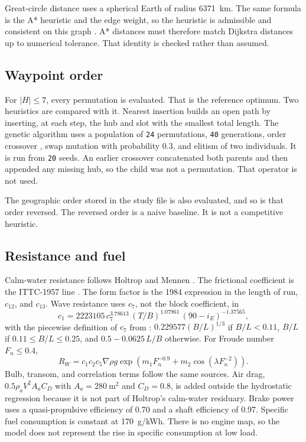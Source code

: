 \documentclass[11pt]{article}
\begin{document}
Great-circle distance uses a spherical Earth of radius 6371~km.
The same formula is the A* heuristic and the edge weight, so the heuristic is admissible and consistent on this graph \citep{hart1968}.
A* distances must therefore match Dijkstra distances \citep{dijkstra1959} up to numerical tolerance.
That identity is checked rather than assumed.

\subsection{Waypoint order}
For \(|H|\le 7\), every permutation is evaluated.
That is the reference optimum.
Two heuristics are compared with it.
Nearest insertion builds an open path by inserting, at each step, the hub and slot with the smallest total length.
The genetic algorithm uses a population of \texttt{24} permutations, \texttt{40} generations, order crossover \citep{davis1985}, swap mutation with probability 0.3, and elitism of two individuals.
It is run from \texttt{20} seeds.
An earlier crossover concatenated both parents and then appended any missing hub, so the child was not a permutation.
That operator is not used.

The geographic order stored in the study file is also evaluated, and so is that order reversed.
The reversed order is a naive baseline.
It is not a competitive heuristic.

\subsection{Resistance and fuel}
Calm-water resistance follows Holtrop and Mennen \citep{holtrop1982,holtrop1984}.
The frictional coefficient is the ITTC-1957 line \citep{ittc1957}.
The form factor is the 1984 expression in the length of run, \(c_{12}\), and \(c_{13}\).
Wave resistance uses \(c_7\), not the block coefficient, in
\begin{equation}
c_1 = 2223105\, c_7^{3.78613}\,(T/B)^{1.07961}\,(90-i_E)^{-1.37565},
\end{equation}
with the piecewise definition of \(c_7\) from \citet{holtrop1984}: \(0.229577(B/L)^{1/3}\) if \(B/L<0.11\), \(B/L\) if \(0.11\le B/L\le 0.25\), and \(0.5-0.0625\,L/B\) otherwise.
For Froude number \(F_n\le 0.4\),
\begin{equation}
R_W = c_1 c_2 c_5 \nabla \rho g \exp\!\left(m_1 F_n^{-0.9} + m_2 \cos(\lambda F_n^{-2})\right).
\end{equation}
Bulb, transom, and correlation terms follow the same sources.
Air drag, \(0.5\rho_a V^2 A_a C_D\) with \(A_a=280~\mathrm{m}^2\) and \(C_D=0.8\), is added outside the hydrostatic regression because it is not part of Holtrop's calm-water residuary.
Brake power uses a quasi-propulsive efficiency of 0.70 and a shaft efficiency of 0.97.
Specific fuel consumption is constant at 170~g/kWh.
There is no engine map, so the model does not represent the rise in specific consumption at low load.
\end{document}
